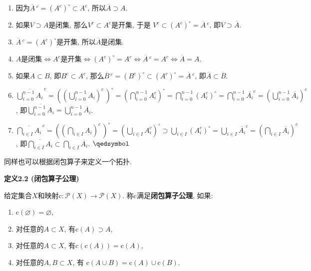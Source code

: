 \documentclass[UTF8]{ctexart}
\begin{document}

\begin{enumerate}
    \item 因为$\overline{A}\,^c=(A^c)^\circ\subset A^c$,
    所以$\overline{A}\supset A$.
    \item 如果$V\supset A$是闭集, 那么$V^c\subset A^c$是开集, 于是
    $V^c\subset(A^c)^\circ=\overline{A}\,^c$, 即$V\supset\overline{A}$.
    \item $\overline{A}\,^c=(A^c)^\circ$是开集, 所以$\overline{A}$是闭集.
    \item $A$是闭集$\iff A^c$是开集$\iff(A^c)^\circ=A^c\iff
    \overline{A}\,^c=A^c\iff\overline{A}=A$.
    \item 如果$A\subset B$, 即$B^c\subset A^c$,
    那么$\overline{B}\,^c=(B^c)^\circ\subset(A^c)^\circ=\overline{A}\,^c$,
    即$\overline{A}\subset\overline{B}$.

    \vspace{3pt}
    \item $\displaystyle\overline{\bigcup_{i=0}^{n-1}A_i}^{\,c}=
    \left(\left(\bigcup_{i=0}^{n-1}A_i\right)^c\,\right)^\circ=
    \left(\bigcap_{i=0}^{n-1}A_i^c\right)^\circ=
    \bigcap_{i=0}^{n-1}(A_i^c)^\circ=\bigcap_{i=0}^{n-1}\overline{A_i}^c=
    \left(\bigcup_{i=0}^{n-1}\overline{A_i}\right)^c$, 即$\displaystyle
    \overline{\bigcup_{i=0}^{n-1}A_i}=\bigcup_{i=0}^{n-1}\overline{A_i}$.

    \vspace{3pt}
    \item $\displaystyle\overline{\bigcap_{i\in I}A_i}^{\,c}=
    \left(\left(\bigcap_{i\in I}A_i\right)^c\,\right)^\circ=
    \left(\bigcup_{i\in I}A_i^c\right)^\circ\supset
    \bigcup_{i\in I}(A_i^c)^\circ=\bigcup_{i\in I}\overline{A_i}^c=
    \left(\bigcap_{i\in I}\overline{A_i}\right)^c$, 即$\displaystyle
    \overline{\bigcap_{i\in I}A_i}\subset\bigcap_{i\in I}\overline{A_i}$.
    \hfill $\qedsymbol$
\end{enumerate}





\newpage

同样也可以根据闭包算子来定义一个拓扑.

\vspace{10pt}

\hypertarget{sec:定义2.2}{}
\noindent\textbf{定义2.2 (闭包算子公理)}

给定集合$X$和映射$\mathrm{c}:\mathcal{P}(X)\to\mathcal{P}(X)$.
称$\mathrm{c}$满足\textbf{闭包算子公理}, 如果:
\begin{enumerate}
    \item $\mathrm{c}(\varnothing)=\varnothing$,
    \item 对任意的$A\subset X$, 有$\mathrm{c}(A)\supset A$,
    \item 对任意的$A\subset X$, 有$\mathrm{c}(\mathrm{c}(A))=\mathrm{c}(A)$,
    \item 对任意的$A,B\subset X$, 有
    $\mathrm{c}(A\cup B)=\mathrm{c}(A)\cup\mathrm{c}(B)$.
\end{enumerate}
\end{document}
